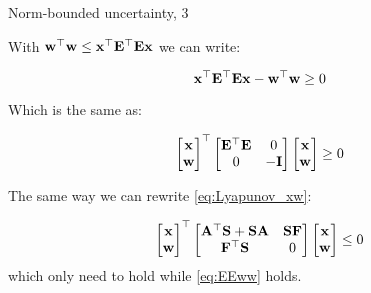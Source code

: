 \documentclass{beamer}
\begin{document}
	\begin{frame}{Norm-bounded uncertainty, 3}
		\begin{flushleft}
			
			With $\mathbf{w}^\top \mathbf{w} 
			\leq
			\mathbf{x}^\top\mathbf{E}^\top \mathbf{E}\mathbf{x}$ we can write:
			
			\begin{equation}
				\mathbf{x}^\top\mathbf{E}^\top \mathbf{E}\mathbf{x} - \mathbf{w}^\top \mathbf{w} \geq 0
			\end{equation}	
			
			Which is the same as:
			
			\begin{equation}
				\label{eq:EEww}
				\begin{bmatrix}
					\mathbf{x} \\ \mathbf{w}
				\end{bmatrix}^\top
				\begin{bmatrix}
					\mathbf{E}^\top \mathbf{E} & 0 \\
					0 & -\mathbf{I}
				\end{bmatrix}		
				\begin{bmatrix}
					\mathbf{x} \\ \mathbf{w}
				\end{bmatrix}
				\geq 0
			\end{equation}	
			
			The same way we can rewrite \eqref{eq:Lyapunov_xw}:
			
			\begin{equation}
				\label{eq:xw_Lyapunov}
				\begin{bmatrix}
					\mathbf{x} \\ \mathbf{w}
				\end{bmatrix}^\top
				\begin{bmatrix}
					\mathbf{A}^\top \mathbf{S} + \mathbf{S}\mathbf{A} & \mathbf{S}\mathbf{F} \\
					\mathbf{F}^\top\mathbf{S} & 0
				\end{bmatrix}		
				\begin{bmatrix}
					\mathbf{x} \\ \mathbf{w}
				\end{bmatrix}
				\leq 0
			\end{equation}	
			which only need to hold while \eqref{eq:EEww} holds.
			
		\end{flushleft}
	\end{frame}
	
	
	
\end{document}
